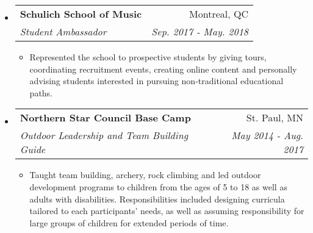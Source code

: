 \documentclass[letterpaper,11pt]{article}
\makeatletter
\newcommand{\resitem}[1]{\item #1 \vspace{-2pt}}
\newcommand{\ressubheading}[4]{
\begin{tabular*}{6.1in}{l@{\extracolsep{\fill}}r}
		\textbf{#1} & #2 \\
		\textit{#3} & \textit{#4} \\
\end{tabular*}\vspace{-1pt}}
\makeatother
\begin{document}
\begin{itemize}
\item
	\ressubheading{Schulich School of Music}{Montreal, QC}{Student Ambassador}{Sep. 2017 - May. 2018}
	\begin{itemize}
		\resitem{Represented the school to prospective students by giving tours, coordinating recruitment events, creating online content and personally advising students interested in pursuing non-traditional educational paths.}
	\end{itemize}

\item
	\ressubheading{Northern Star Council Base Camp}{St. Paul, MN}{Outdoor Leadership and Team Building Guide}{May 2014 - Aug. 2017}
	\begin{itemize}
		\resitem{Taught team building, archery, rock climbing and led outdoor development programs to children from the ages of 5 to 18 as well as adults with disabilities. Responsibilities included designing curricula tailored to each participants' needs, as well as assuming responsibility for large groups of children for extended periods of time.}
	\end{itemize}

\end{itemize}
\end{document}
